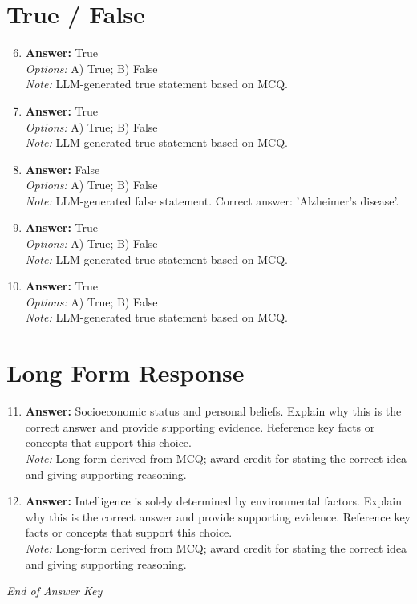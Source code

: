 \documentclass[12pt]{article}
\begin{document}
\section*{True / False}
\begin{enumerate}[label=\arabic*.]
\setcounter{enumi}{5}
\item \textbf{Answer:} True
\\ \textit{Options:} A) True; B) False
\\ \textit{Note:} LLM-generated true statement based on MCQ.
\item \textbf{Answer:} True
\\ \textit{Options:} A) True; B) False
\\ \textit{Note:} LLM-generated true statement based on MCQ.
\item \textbf{Answer:} False
\\ \textit{Options:} A) True; B) False
\\ \textit{Note:} LLM-generated false statement. Correct answer: 'Alzheimer's disease'.
\item \textbf{Answer:} True
\\ \textit{Options:} A) True; B) False
\\ \textit{Note:} LLM-generated true statement based on MCQ.
\item \textbf{Answer:} True
\\ \textit{Options:} A) True; B) False
\\ \textit{Note:} LLM-generated true statement based on MCQ.
\end{enumerate}

\section*{Long Form Response}
\begin{enumerate}[label=\arabic*.]
\setcounter{enumi}{10}
\item \textbf{Answer:} Socioeconomic status and personal beliefs. Explain why this is the correct answer and provide supporting evidence. Reference key facts or concepts that support this choice.
\\ \textit{Note:} Long-form derived from MCQ; award credit for stating the correct idea and giving supporting reasoning.
\item \textbf{Answer:} Intelligence is solely determined by environmental factors. Explain why this is the correct answer and provide supporting evidence. Reference key facts or concepts that support this choice.
\\ \textit{Note:} Long-form derived from MCQ; award credit for stating the correct idea and giving supporting reasoning.
\end{enumerate}

\vfill
\noindent\textit{End of Answer Key}
\end{document}
